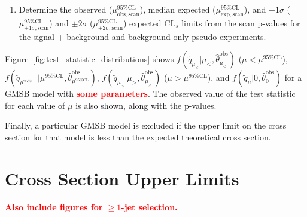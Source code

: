 \documentclass[dissertation.tex]{subfiles}
\begin{document}
\begin{enumerate}
\item Determine the observed ($\mu^{95\%\mathrm{CL}}_{\mathrm{obs,scan}}$), median expected ($\mu^{95\%\mathrm{CL}}_{\mathrm{exp,scan}}$), and $\pm1\sigma$ ($\mu^{95\%\mathrm{CL}}_{\pm1\sigma\mathrm{,scan}}$) and $\pm2\sigma$ ($\mu^{95\%\mathrm{CL}}_{\pm2\sigma\mathrm{,scan}}$) expected $\mbox{CL}_{s}$ limits from the scan p-values for the signal + background and background-only pseudo-experiments.
\end{enumerate}

Figure~\ref{fig:test_statistic_distributions} shows $f(\tilde{q}_{\mu_{<}} | \mu_{<}, \hat{\theta}_{\mu_{<}}^{\mathrm{obs}})$ ($\mu < \mu^{95\%\mathrm{CL}}$), $f(\tilde{q}_{\mu^{95\%\mathrm{CL}}} | \mu^{95\%\mathrm{CL}}, \hat{\theta}_{\mu^{95\%\mathrm{CL}}}^{\mathrm{obs}})$, $f(\tilde{q}_{\mu_{>}} | \mu_{>}, \hat{\theta}_{\mu_{>}}^{\mathrm{obs}})$ ($\mu > \mu^{95\%\mathrm{CL}}$), and $f(\tilde{q}_{\mu} | 0, \hat{\theta}_{0}^{\mathrm{obs}})$ for a GMSB model with \textcolor{red}{\textbf{some parameters}}.  The observed value of the test statistic for each value of $\mu$ is also shown, along with the p-values.


Finally, a particular GMSB model is excluded if the upper limit on the cross section for that model is less than the expected theoretical cross section.

\section{Cross Section Upper Limits}
\label{sec:Cross Section Upper Limits}

\textcolor{red}{\textbf{Also include figures for $\geq1$-jet selection.}}
\end{document}
